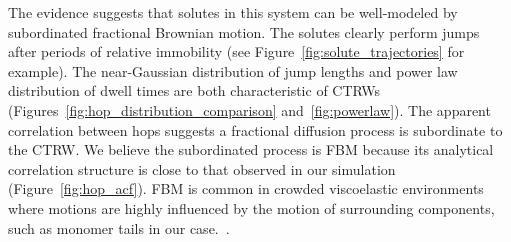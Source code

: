 \documentclass{article}
\begin{document}
  The evidence suggests that solutes in this system can be well-modeled by 
  subordinated fractional Brownian motion. The solutes clearly perform jumps after periods of relative immobility
  (see Figure~\ref{fig:solute_trajectories} for example). The near-Gaussian distribution
  of jump lengths and power law distribution of dwell times are both characteristic of 
  CTRWs (Figures~\ref{fig:hop_distribution_comparison} and~\ref{fig:powerlaw}). The apparent
  correlation between hops suggests a fractional diffusion process is subordinate to the
  CTRW. We believe the subordinated process is FBM because its analytical correlation 
  structure is close to that observed in our simulation (Figure~\ref{fig:hop_acf}). FBM
  is common in crowded viscoelastic environments where motions are highly influenced by
  the motion of surrounding components, such as monomer tails in our case.~\cite{ernst_fractional_2012}.
  
\end{document}
